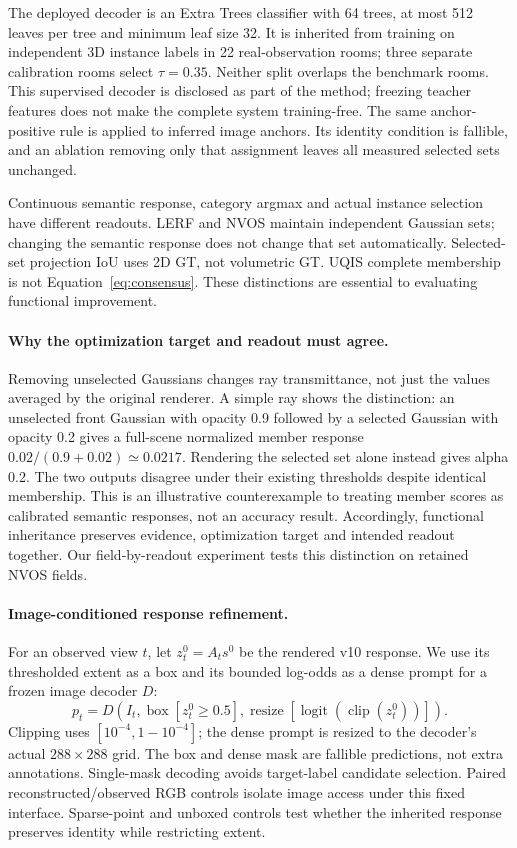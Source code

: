The deployed decoder is an Extra Trees classifier with 64 trees, at most 512
leaves per tree and minimum leaf size 32. It is inherited from training on
independent 3D instance labels in 22 real-observation rooms; three separate
calibration rooms select $\tau=0.35$. Neither split overlaps the benchmark
rooms. This supervised decoder is disclosed as part of the method; freezing
teacher features does not make the complete system training-free. The same
anchor-positive rule is applied to inferred image anchors. Its identity
condition is fallible, and an ablation removing only that assignment leaves
all measured selected sets unchanged.

Continuous semantic response, category argmax and actual instance selection
have different readouts. LERF and NVOS maintain independent Gaussian sets;
changing the semantic response does not change that set automatically.
Selected-set projection IoU uses 2D GT, not volumetric GT. UQIS complete
membership is not Equation~\ref{eq:consensus}. These distinctions are essential
to evaluating functional improvement.

\paragraph{Why the optimization target and readout must agree.}
Removing unselected Gaussians changes ray transmittance, not just the values
averaged by the original renderer. A simple ray shows the distinction: an
unselected front Gaussian with opacity 0.9 followed by a selected Gaussian with
opacity 0.2 gives a full-scene normalized member response
$0.02/(0.9+0.02)\simeq0.0217$. Rendering the selected set alone instead gives
alpha 0.2. The two outputs disagree under their existing thresholds despite
identical membership. This is an illustrative counterexample to treating member
scores as calibrated semantic responses, not an accuracy result. Accordingly,
functional inheritance preserves evidence, optimization target and intended
readout together. Our field-by-readout experiment tests this distinction on
retained NVOS fields.

\paragraph{Image-conditioned response refinement.}
For an observed view $t$, let $z_t^0=A_t s^0$ be the rendered v10 response.
We use its thresholded extent as a box and its bounded log-odds as a dense
prompt for a frozen image decoder $D$:
\begin{equation}
 p_t=D(I_t,\operatorname{box}[z_t^0\geq0.5],
       \operatorname{resize}[\operatorname{logit}(\operatorname{clip}(z_t^0))]).
\end{equation}
Clipping uses $[10^{-4},1-10^{-4}]$; the dense prompt is resized to the
decoder's actual $288\times288$ grid. The box and dense mask are fallible
predictions, not extra annotations. Single-mask decoding avoids target-label
candidate selection. Paired reconstructed/observed RGB controls isolate image
access under this fixed interface. Sparse-point and unboxed controls test
whether the inherited response preserves identity while restricting extent.

